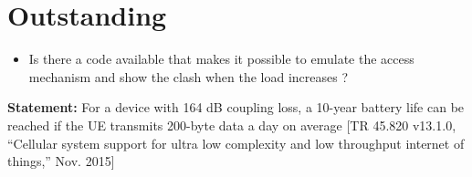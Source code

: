 \documentclass[10pt,a4paper,titlepage,twoside]{article}
\newcommand{\hh}[1]{\textbf{\color{ymaorng} #1}}
\newcommand{\point}[1]{\textbf{\color{ymared} #1}}
\begin{document}
\clearpage
\section{\point{Outstanding}}

\begin{itemize}
\item Is there a code available that makes it possible to emulate the access mechanism and show the clash when the load increases ?

\end{itemize}

\hh{Statement:} For a device with 164 dB coupling loss, a 10-year battery life can be reached if the UE transmits 200-byte data a day on average {[TR 45.820 v13.1.0, “Cellular system support for ultra low complexity and low throughput internet of things,” Nov. 2015]}
\end{document}
